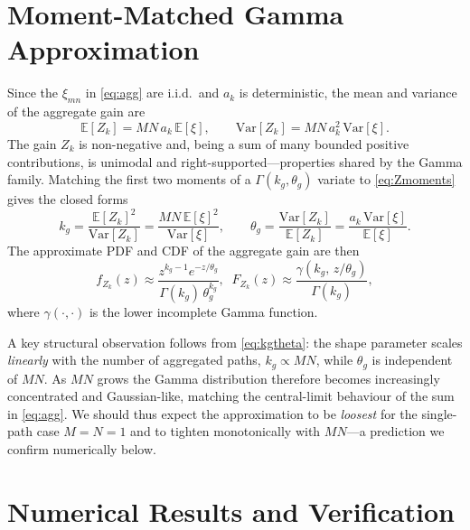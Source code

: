 \documentclass[conference]{IEEEtran}
\begin{document}
\section{Moment-Matched Gamma Approximation}
\label{sec:gamma}
Since the $\xi_{mn}$ in \eqref{eq:agg} are i.i.d.\ and $a_k$ is deterministic,
the mean and variance of the aggregate gain are
\begin{equation}
\mathbb{E}[Z_k]=MN\,a_k\,\mathbb{E}[\xi],\qquad
\mathrm{Var}[Z_k]=MN\,a_k^{2}\,\mathrm{Var}[\xi].
\label{eq:Zmoments}
\end{equation}
The gain $Z_k$ is non-negative and, being a sum of many bounded positive
contributions, is unimodal and right-supported---properties shared by the
Gamma family. Matching the first two moments of a $\Gamma(k_g,\theta_g)$
variate to \eqref{eq:Zmoments} gives the closed forms
\begin{equation}
k_g=\frac{\mathbb{E}[Z_k]^2}{\mathrm{Var}[Z_k]}
   =\frac{MN\,\mathbb{E}[\xi]^2}{\mathrm{Var}[\xi]},\qquad
\theta_g=\frac{\mathrm{Var}[Z_k]}{\mathbb{E}[Z_k]}
        =\frac{a_k\,\mathrm{Var}[\xi]}{\mathbb{E}[\xi]}.
\label{eq:kgtheta}
\end{equation}
The approximate PDF and CDF of the aggregate gain are then
\begin{equation}
f_{Z_k}(z)\!\approx\!\frac{z^{k_g-1}e^{-z/\theta_g}}
{\Gamma(k_g)\,\theta_g^{k_g}},\;\;
F_{Z_k}(z)\!\approx\!\frac{\gamma\!\left(k_g,\,z/\theta_g\right)}{\Gamma(k_g)},
\label{eq:gammapdf}
\end{equation}
where $\gamma(\cdot,\cdot)$ is the lower incomplete Gamma function.

A key structural observation follows from \eqref{eq:kgtheta}: the shape
parameter scales \emph{linearly} with the number of aggregated paths,
$k_g\propto MN$, while $\theta_g$ is independent of $MN$. As $MN$ grows the
Gamma distribution therefore becomes increasingly concentrated and
Gaussian-like, matching the central-limit behaviour of the sum in
\eqref{eq:agg}. We should thus expect the approximation to be \emph{loosest}
for the single-path case $M{=}N{=}1$ and to tighten monotonically with
$MN$---a prediction we confirm numerically below.

\section{Numerical Results and Verification}
\label{sec:results}
\end{document}
